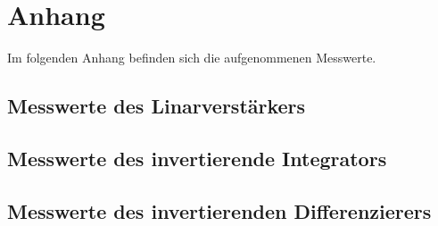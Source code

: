\newpage
\section{Anhang}
Im folgenden Anhang befinden sich die aufgenommenen Messwerte.\\

\subsection{Messwerte des Linarverstärkers} 
\label{sub:Messwerte des Linarverstärkers}



\FloatBarrier

\subsection{Messwerte des invertierende Integrators}
\label{sub:Messwerte des invertierende Integrators}

\FloatBarrier

\subsection{Messwerte des invertierenden Differenzierers}
\label{sub:Messwerte des invertierenden Differenzierers}

\FloatBarrier


%
